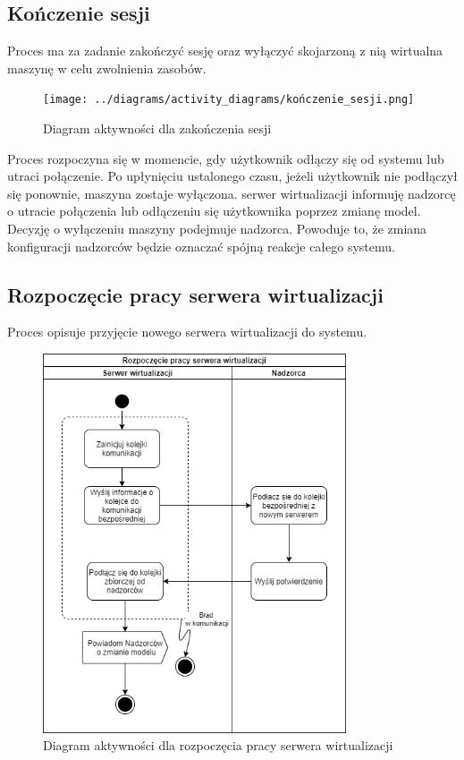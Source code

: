 \documentclass[../opis-rozwiazania.tex]{subfiles}
\begin{document}
\subsection{Kończenie sesji}

Proces ma za zadanie zakończyć sesję oraz wyłączyć skojarzoną z nią wirtualna maszynę w celu zwolnienia zasobów.

\begin{figure}[H]
    \centering
    \texttt{[image: ../diagrams/activity\_diagrams/kończenie\_sesji.png]}
    \caption{Diagram aktywności dla zakończenia sesji}
    \label{finish_session}
\end{figure}

Proces rozpoczyna się w momencie, gdy użytkownik odłączy się od systemu lub utraci połączenie. Po upłynięciu ustalonego czasu, jeżeli użytkownik nie podłączył się ponownie, maszyna zostaje wyłączona.
serwer wirtualizacji informuję nadzorcę o utracie połączenia lub odłączeniu się użytkownika poprzez zmianę model.
Decyzję o wyłączeniu maszyny podejmuje nadzorca.
Powoduje to, że zmiana konfiguracji nadzorców będzie oznaczać spójną reakcje całego systemu.

\subsection{Rozpoczęcie pracy serwera wirtualizacji}

Proces opisuje przyjęcie nowego serwera wirtualizacji do systemu.

\begin{figure}[H]
    \centering
    \includegraphics[width=0.8\textwidth]{../diagrams/activity_diagrams/serwer_start.png}
    \caption{Diagram aktywności dla rozpoczęcia pracy serwera wirtualizacji}
    \label{start_virtsrv}
\end{figure}
\end{document}
